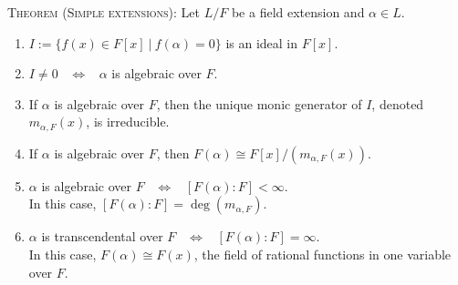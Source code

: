 \documentclass[12pt]{amsart}
\begin{document}
	\begin{framed}
	
\textsc{Theorem (Simple extensions):} Let $L/F$ be a field extension and $\alpha\in L$.

\medskip

\begin{enumerate}
\item $I:=\{ f(x) \in F[x] \ | \ f(\alpha) = 0\}$ is an ideal in $F[x]$.

\medskip


\item $I\neq 0$ \ $\Longleftrightarrow$ \ $\alpha$ is algebraic over $F$.

\medskip

\item If $\alpha$ is algebraic over $F$, then the unique monic generator of $I$, denoted $m_{\alpha,F}(x)$, is irreducible.

\medskip

\item  If $\alpha$ is algebraic over $F$, then $F(\alpha) \cong F[x]/(m_{\alpha,F}(x))$.

\medskip

\item $\alpha$ is algebraic over $F$ \ $\Longleftrightarrow$ \ $[F(\alpha):F] < \infty$. \\
In this case, $[F(\alpha):F] = \deg(m_{\alpha,F})$.

\medskip

\item $\alpha$ is transcendental over $F$ \ $\Longleftrightarrow$ \ $[F(\alpha):F] = \infty$. \\
In this case, $F(\alpha) \cong F(x)$, the field of rational functions in one variable over $F$.
\end{enumerate}

\end{framed}
\end{document}
